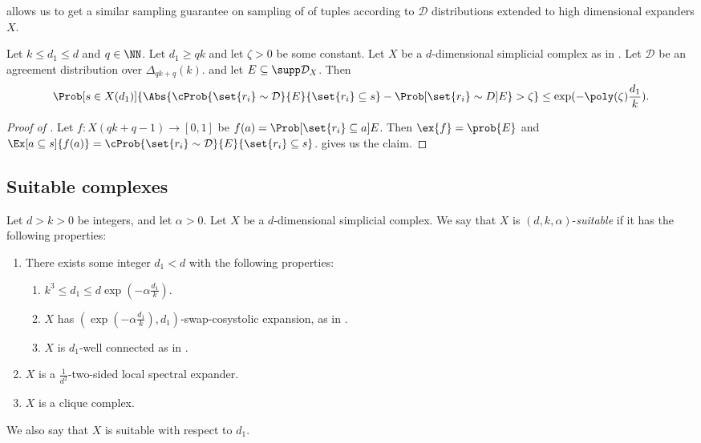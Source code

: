  allows us to get a similar sampling guarantee on sampling of of tuples according to \(\mathcal{D}\) distributions extended to high dimensional expanders \(X\).

\begin{claim} \label{claim:edge-sampling}
    Let \(k \leq d_1 \leq d\) and \(q \in \NN\). Let \(d_1 \geq qk\) and let \(\zeta > 0\) be some constant. Let \(X\) be a \(d\)-dimensional simplicial complex as in . Let \(\mathcal{D}\) be an agreement distribution over \(\Delta_{qk+q}(k)\). and let \(E \subseteq \supp \mathcal{D}_X\). Then
    \[\Prob[s \in X(d_1)]{\Abs{\cProb{\set{r_i} \sim \mathcal{D}}{E}{\set{r_i} \subseteq s} - \Prob[\set{r_i} \sim D]{E}} > \zeta} \leq \exp(-\poly(\zeta) \frac{d_1}{k}).\]
\end{claim}

\begin{proof}[Proof of ]
    Let \(f:X(qk+q-1) \to [0,1]\) be \(f(a)=\Prob[\set{r_i} \subseteq a]{E}\). Then \(\ex{f}=\prob{E}\) and \(\Ex[a \subseteq s]{f(a)} = \cProb{\set{r_i} \sim \mathcal{D}}{E}{\set{r_i} \subseteq s}\).  gives us the claim.
\end{proof}

\subsection{Suitable complexes}
\begin{definition} \label{def:suitable-complexes}
    Let \(d>k>0\) be integers, and let \(\alpha > 0\). Let \(X\) be a \(d\)-dimensional simplicial complex. We say that \(X\) is \((d,k,\alpha)\)-\emph{suitable} if it has the following properties: 
\begin{enumerate}
    \item There exists some integer \(d_1<d\) with the following properties:
    \begin{enumerate}
        \item \(k^3 \leq d_1 \leq d \exp(-\alpha\frac{d_1}{k})\).
        \item \label{item:cob-exp} $X$ has \((\exp(-\alpha \frac{d_1}{k}),d_1)\)-swap-cosystolic expansion, as in . 
        \item \label{item:well-connected} \(X\) is \(d_1\)-well connected as in .
    \end{enumerate}
    \item \(X\) is a \(\frac{1}{d^2}\)-two-sided local spectral expander.
    \item \(X\) is a clique complex. 
    \end{enumerate}
We also say that $X$ is suitable with respect to $d_1$.
\end{definition}

